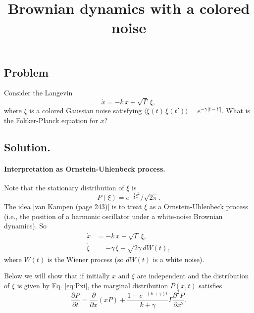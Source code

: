 \documentclass{article}
\begin{document}
\title{Brownian dynamics with a colored noise}
\author{ \vspace{-10ex} }
\date{ \vspace{-10ex} }
\maketitle

\subsection*{Problem}
Consider the Langevin
$$
\dot x = -k \, x + \sqrt{\Gamma} \, \xi,
$$
where $\xi$ is a colored Gaussian noise satisfying
$\langle \xi(t) \, \xi(t') \rangle = e^{-\gamma \, |t-t'|}$.
What is the Fokker-Planck equation for $x$?

\subsection*{Solution.}

\paragraph{Interpretation as Ornstein-Uhlenbeck process.}

Note that the stationary distribution of $\xi$ is
\begin{equation}
P(\xi) = e^{-\frac{1}{2}\xi^2}/\sqrt{2\pi}.
\label{eq:Pxi}
\end{equation}
%
The idea [van Kampen (page 243)] is
to treat $\xi$ as a Ornstein-Uhlenbeck process
(i.e., the position of a harmonic oscillator under
a white-noise Brownian dynamics).
%
So
\begin{equation}
  \begin{aligned}
    \dot x &= -k \, x + \sqrt{\Gamma} \, \xi, \\
    \dot \xi &= -\gamma \, \xi + \sqrt{2 \gamma} \, d W(t),
  \end{aligned}
  \label{eq:ho_colorednoise_x}
\end{equation}
where $W(t)$ is the Wiener process (so $dW(t)$ is a white noise).

Below we will show that
if initially $x$ and $\xi$ are independent
and the distribution of $\xi$ is given by Eq. \eqref{eq:Pxi},
the marginal distribution $P(x, t)$ satisfies
\begin{equation}
\frac{ \partial P } { \partial t } = \frac{ \partial } { \partial x } (x P)
+
\frac{ 1 - e^{-(k+\gamma) t} } {k + \gamma} \Gamma
\frac{ \partial^2 P } { \partial x^2 }.
\label{eq:ho_colorednoise_Px}
\end{equation}
\end{document}
